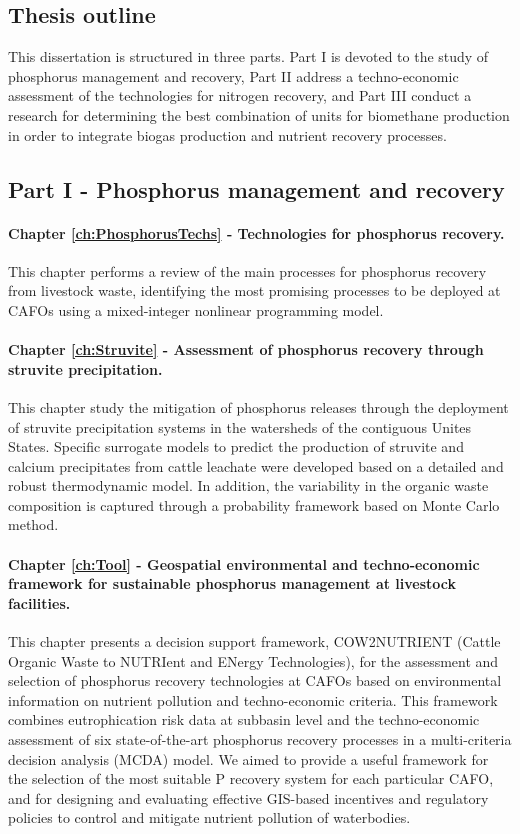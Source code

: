 \begin{refsection}[referencesCh1]
\section{Thesis outline}
This dissertation is structured in three parts. Part I is devoted to the study of phosphorus management and recovery, Part II address a techno-economic assessment of the technologies for nitrogen recovery, and Part III conduct a research for determining the best combination of units for biomethane production in order to integrate biogas production and nutrient recovery processes.

\subsection{Part I - Phosphorus management and recovery}
\paragraph{Chapter \ref{ch:PhosphorusTechs} - Technologies for phosphorus recovery.} This chapter performs a review of the main processes for phosphorus recovery from livestock waste, identifying the most promising processes to be deployed at CAFOs using a mixed-integer nonlinear programming model.

\paragraph{Chapter \ref{ch:Struvite} - Assessment of phosphorus recovery through struvite precipitation.} This chapter study the mitigation of phosphorus releases through the deployment of struvite precipitation systems in the watersheds of the contiguous Unites States. Specific surrogate models to predict the production of struvite and calcium precipitates from cattle leachate were developed based on a detailed and robust thermodynamic model. In addition, the variability in the organic waste composition is captured through a probability framework based on Monte Carlo method.

\paragraph{Chapter \ref{ch:Tool} - Geospatial environmental and techno-economic framework for sustainable phosphorus management at livestock facilities.} This chapter presents a decision support framework, COW2NUTRIENT (Cattle Organic Waste to NUTRIent and ENergy Technologies), for the assessment and selection of phosphorus recovery technologies at CAFOs based on environmental information on nutrient pollution and techno-economic criteria. This framework combines eutrophication risk data at subbasin level and the techno-economic assessment of six state-of-the-art phosphorus recovery processes in a multi-criteria decision analysis (MCDA) model. We aimed to provide a useful framework for the selection of the most suitable P recovery system for each particular CAFO, and for designing and evaluating effective GIS-based incentives and regulatory policies to control and mitigate nutrient pollution of waterbodies.


\end{refsection}
